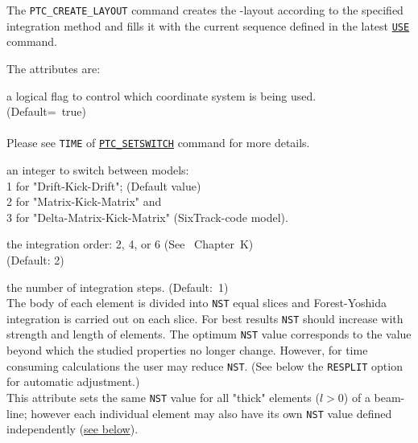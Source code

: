 The \texttt{PTC\_CREATE\_LAYOUT} command creates the \ptc-layout
according to  the specified integration method and fills it with the
current \madx sequence defined in the latest
\hyperref[sec:use]{\texttt{USE}} command.


The attributes are:
\begin{madlist}

   a logical flag to control which coordinate system
  is being used. \\ (Default=~true) \\ \\
  Please see \texttt{TIME} of \hyperref[sec:ptc-setswitch]{\texttt{PTC\_SETSWITCH}}
  command for more details.

   an integer to switch between models:\\
  1 for "Drift-Kick-Drift";  (Default value)\\
  2 for "Matrix-Kick-Matrix" and \\
  3 for "Delta-Matrix-Kick-Matrix" (SixTrack-code model).

   the integration order: 2, 4, or 6 (See
  \cite{forest2002}~Chapter~K) \\ (Default: 2)

   the number of integration steps.  (Default:~1)\\
  The body of each element is divided into \texttt{NST} equal slices and
  Forest-Yoshida integration is carried out on each slice.
  For best results \texttt{NST} should increase with strength
  and length of elements. The optimum \texttt{NST} value corresponds to
  the value beyond which the studied properties no longer change.
  However, for time consuming calculations the user may
  reduce \texttt{NST}. (See below the \texttt{RESPLIT} option for automatic
  adjustment.)\\
  This attribute sets the same \texttt{NST} value  for all "thick" elements
  ($l > 0$) of a beam-line; however each individual element may also have
  its own \texttt{NST} value defined independently
  (\hyperref[sec:add-option-PTC]{see below}).


\end{madlist}
